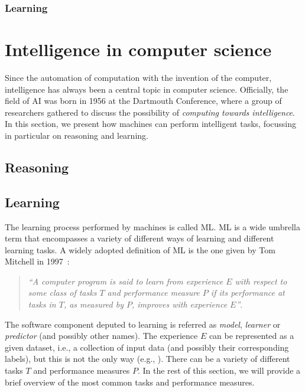 \subsubsection{Learning}\label{subsubsec:learning}
%



\section{Intelligence in computer science}\label{sec:intelligence-in-computer-science}

Since the automation of computation with the invention of the computer, intelligence has always been a central topic in computer science.
%
Officially, the field of \gls{AI} was born in 1956 at the Dartmouth Conference, where a group of researchers gathered to discuss the possibility of \emph{computing towards intelligence}.
%
In this section, we present how machines can perform intelligent tasks, focussing in particular on reasoning and learning.

\subsection{Reasoning}\label{subsec:reasoning}
%

\subsection{Learning}\label{subsec:machine-learning}
%
The learning process performed by machines is called \gls{ML}.
%
\gls{ML} is a wide umbrella term that encompasses a variety of different ways of learning and different learning tasks.
%
A widely adopted definition of \gls{ML} is the one given by Tom Mitchell in 1997~\cite{DBLP:books/daglib/0087929}:
%
\begin{quote}
    \emph{``A computer program is said to learn from experience $E$ with respect to some class of tasks $T$ and performance measure $P$ if its performance at tasks in $T$, as measured by $P$, improves with experience $E$''}.
\end{quote}
%
The software component deputed to learning is referred as \emph{model}, \emph{learner} or \emph{predictor} (and possibly other names).
%
The experience $E$ can be represented as a given dataset, i.e., a collection of input data (and possibly their corresponding labels), but this is not the only way (e.g., ).
%
There can be a variety of different tasks $T$ and performance measures $P$.
%
In the rest of this section, we will provide a brief overview of the most common tasks and performance measures.


